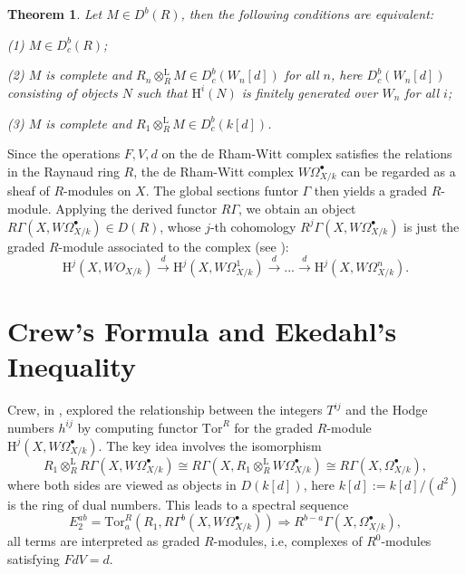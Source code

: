 \documentclass[a4paper,12pt,twoside]{report}
\newtheorem{theorem}{Theorem}[section]
\newcommand{\HH}{\mathrm{H}}
\newcommand{\Ld}{\mathrm{L}}
\newcommand{\Tor}{\mathrm{Tor}}
\begin{document}
\begin{theorem}
    Let $M\in D^b(R)$, then the following conditions are equivalent:

{\rm (1)} $M\in D_c^b(R)$;

{\rm (2)} $M$ is complete and $R_n\otimes^{\Ld}_R M\in D^b_{c}(W_n[d])$ for all $n$, here $D^b_c(W_n[d])$ consisting of objects 
$N$ such that $\HH^i(N)$ is finitely generated over $W_n$ for all $i$; 

{\rm (3)} $M$ is complete and $R_1\otimes^{\Ld}_R M\in D^b_c(k[d])$. 
\end{theorem}

Since the operations $F,V,d$ on the de Rham-Witt complex satisfies the relations in the Raynaud ring $R$, 
the de Rham-Witt complex $W\Omega^\bullet_{X/k}$ can be regarded as a sheaf of $R$-modules on $X$. 
The global sections funtor $\Gamma$ then yields a graded $R$-module. 
Applying the derived functor $R\Gamma$, we obtain an object $R\Gamma(X,W\Omega^\bullet_{X/k})\in D(R)$, 
whose $j$-th cohomology $R^j\Gamma(X,W\Omega^\bullet_{X/k})$ is just the graded $R$-module associated to the complex (see \cite{I2}): 
\begin{equation*}
    \HH^j(X,WO_{X/k}) \xrightarrow{d} \HH^j(X,W\Omega^1_{X/k}) \xrightarrow{d} ... \xrightarrow{d} 
    \HH^j(X,W\Omega^n_{X/k}).
\end{equation*}

\section{Crew's Formula and Ekedahl's Inequality}


Crew, in \cite{Cr}, explored the relationship between the integers $T^{ij}$ 
and the Hodge numbers $h^{ij}$ by computing functor \(\Tor^R\)
for the graded $R$-module $\HH^j(X,W\Omega^\bullet_{X/k})$. The key idea involves the isomorphism
\[R_1\otimes^{\Ld}_R R\Gamma(X,W\Omega^\bullet_{X/k})\cong R\Gamma(X, R_1\otimes^{\Ld}_{R}W\Omega^\bullet_{X/k})\cong R\Gamma(X,\Omega^\bullet_{X/k}),\]
where both sides are viewed as objects in $D(k[d])$, here $k[d]:=k[d]/(d^2)$ is the ring of dual numbers. This leads to a spectral sequence
\[E_2^{ab}=\Tor^R_a(R_1,R\Gamma^b(X,W\Omega^\bullet_{X/k}))\Rightarrow R^{b-a}\Gamma(X,\Omega^\bullet_{X/k}),\] 
all terms are interpreted as graded $R$-modules, i.e, complexes of $R^0$-modules satisfying $FdV=d$. 
\end{document}
